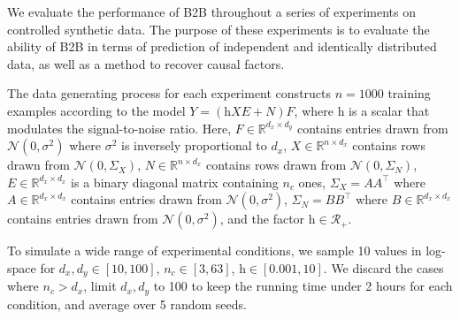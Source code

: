 We evaluate the performance of B2B throughout a series of experiments on
controlled synthetic data.
%
The purpose of these experiments is to evaluate the ability of B2B in terms of
prediction of independent and identically distributed data, as well as a method
to recover causal factors.

The data generating process for each experiment constructs $n=1000$ training examples
according to the model $Y = (\text{h} XE + N)F$, where $\text{h}$ is a
scalar that modulates the signal-to-noise ratio.
%
Here,
    $F \in \mathbb{R}^{d_x \times d_y}$ contains entries drawn from
$\mathcal{N}(0, \sigma^2)$ where $\sigma^2$ is inversely proportional to $d_x$,
$X \in \mathbb{R}^{n \times d_x}$ contains rows
drawn from $\mathcal{N}(0, \Sigma_X)$, $N \in \mathbb{R}^{n \times d_x}$
contains rows drawn from $\mathcal{N}(0, \Sigma_N)$, $E \in \mathbb{R}^{d_x
\times d_x}$ is a binary diagonal matrix containing $n_c$ ones, $\Sigma_X =
AA^\top$ where $A \in \mathbb{R}^{d_x \times d_x}$ contains entries drawn from
$\mathcal{N}(0, \sigma^2)$, $\Sigma_N = BB^\top$ where $B \in \mathbb{R}^{d_x
\times d_x}$ contains entries drawn from $\mathcal{N}(0, \sigma^2)$, and the
factor $\text{h} \in \mathcal{R}_+$.

To simulate a wide range of experimental conditions, we sample 10 values in log-space for $d_x, d_y \in \left[ 10, 100 \right]$, $n_c \in \left[ 3, 63 \right]$,
$\text{h} \in \left[ 0.001, 10 \right]$. We discard the cases where $n_c > d_x$, limit $d_x, d_y$ to 100 to keep the running time under 2 hours for each condition, and average over 5 random seeds.
%

